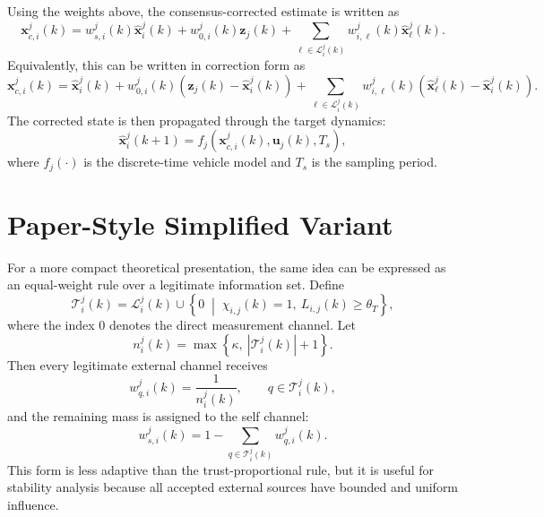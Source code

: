 \documentclass[11pt]{article}
\newcommand{\T}{\mathcal{T}}
\newcommand{\Lset}{\mathcal{L}}
\begin{document}
Using the weights above, the consensus-corrected estimate is written as
\begin{equation}
    \bm{x}_{c,i}^{j}(k)
    =
    w_{s,i}^{j}(k)\hat{\bm{x}}_{i}^{j}(k)
    +
    w_{0,i}^{j}(k)\bm{z}_{j}(k)
    +
    \sum_{\ell\in\Lset_i^j(k)}
    w_{i,\ell}^{j}(k)\hat{\bm{x}}_{\ell}^{j}(k).
    \label{eq:convex_update}
\end{equation}
Equivalently, this can be written in correction form as
\begin{equation}
    \bm{x}_{c,i}^{j}(k)
    =
    \hat{\bm{x}}_{i}^{j}(k)
    +
    w_{0,i}^{j}(k)
    \left(\bm{z}_{j}(k)-\hat{\bm{x}}_{i}^{j}(k)\right)
    +
    \sum_{\ell\in\Lset_i^j(k)}
    w_{i,\ell}^{j}(k)
    \left(\hat{\bm{x}}_{\ell}^{j}(k)-\hat{\bm{x}}_{i}^{j}(k)\right).
    \label{eq:correction_update}
\end{equation}
The corrected state is then propagated through the target dynamics:
\begin{equation}
    \hat{\bm{x}}_{i}^{j}(k+1)
    =
    f_j\!\left(
        \bm{x}_{c,i}^{j}(k),
        \bm{u}_{j}(k),
        T_s
    \right),
    \label{eq:prediction}
\end{equation}
where \(f_j(\cdot)\) is the discrete-time vehicle model and \(T_s\) is the
sampling period.

\section{Paper-Style Simplified Variant}

For a more compact theoretical presentation, the same idea can be expressed as
an equal-weight rule over a legitimate information set. Define
\begin{equation}
    \T_i^j(k)
    =
    \Lset_i^j(k)
    \cup
    \left\{0 \; \middle| \; \chi_{i,j}(k)=1,\ L_{i,j}(k)\geq\theta_T\right\},
\end{equation}
where the index \(0\) denotes the direct measurement channel. Let
\begin{equation}
    n_i^j(k)=\max\left\{\kappa,\ |\T_i^j(k)|+1\right\}.
\end{equation}
Then every legitimate external channel receives
\begin{equation}
    w_{q,i}^{j}(k)
    =
    \frac{1}{n_i^j(k)},
    \qquad q\in\T_i^j(k),
\end{equation}
and the remaining mass is assigned to the self channel:
\begin{equation}
    w_{s,i}^{j}(k)
    =
    1
    -
    \sum_{q\in\T_i^j(k)} w_{q,i}^{j}(k).
\end{equation}
This form is less adaptive than the trust-proportional rule, but it is useful
for stability analysis because all accepted external sources have bounded and
uniform influence.
\end{document}
